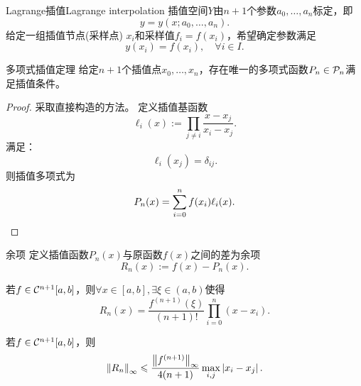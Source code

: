 \begin{definition}
    {Lagrange插值}{Lagrange interpolation}
    插值空间$Y$由$n+1$个参数$a_0,\ldots,a_n$标定，即
    \[
        y=y(x;a_0,\ldots,a_n).
    \]
    给定一组插值节点(采样点) $x_i$和采样值$f_i=f(x_i)$，希望确定参数满足
    \begin{equation}
        y(x_i)=f(x_i),\quad\forall i\in I.
    \end{equation}
\end{definition}

\begin{theorem}
    {多项式插值定理}{}
    给定$n+1$个插值点$x_0,\ldots,x_n$，存在唯一的多项式函数$P_n\in\mathcal P_n$满足插值条件。
\end{theorem}
\begin{proof}
    采取直接构造的方法。
    定义插值基函数
    \begin{equation}
        \ell_i(x):=\prod_{j\neq i}\frac{x-x_j}{x_i-x_j}.
    \end{equation}
    满足：
    \begin{equation}
        \ell_i(x_j)=\delta_{ij}.
    \end{equation}
    则插值多项式为
    \begin{equation}
        P_n(x)=\sum_{i=0}^nf(x_i)\ell_i(x).
        \qedhere
    \end{equation}
\end{proof}

\begin{definition}
    {余项}{}
    定义插值函数$P_n(x)$与原函数$f(x)$之间的差为余项
    \begin{equation}
        R_n(x):=f(x)-P_n(x).
    \end{equation}
\end{definition}

\begin{theorem}
    {}{}
    若$f\in\mathcal C^{n+1}[a,b]$，则$\forall x\in[a,b],\exists\xi\in(a,b)$使得
    \begin{equation}
        R_n(x)=\frac{f^{(n+1)}(\xi)}{(n+1)!}\prod_{i=0}^n(x-x_i).
    \end{equation}
\end{theorem}

\begin{corollary}
    若$f\in\mathcal C^{n+1}[a,b]$，则
    \begin{equation}
        \left\lVert R_n\right\rVert_\infty\leqslant\frac{\left\lVert f^{(n+1)}\right\rVert_\infty}{4(n+1)}\max_{i,j}\left\lvert x_i-x_j\right\rvert.
    \end{equation}
\end{corollary}


